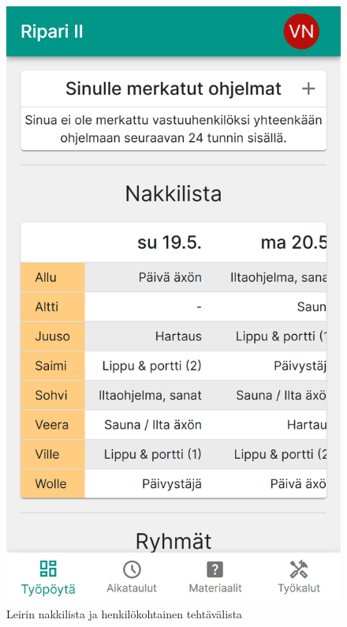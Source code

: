 \begin{figure}[h!]
    \centering
    \begin{minipage}[b]{.3\textwidth}
        \includegraphics[width=\textwidth]{figures/isosapp-nakkilista.png}
        \caption{Leirin nakkilista ja henkilökohtainen tehtävälista}
        \label{fig:isosapp-nakkilista}
    \end{minipage}\qquad
    \begin{minipage}[b]{.3\textwidth}

\end{minipage}
\end{figure}
